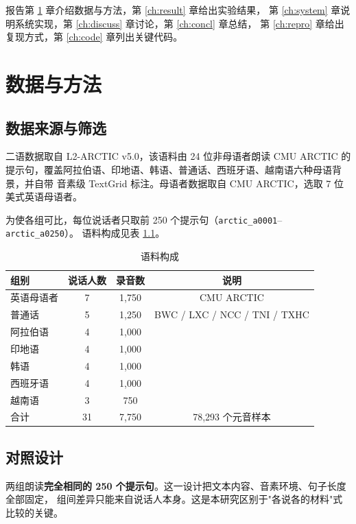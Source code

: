 \documentclass[12pt,a4paper,fontset=fandol]{ctexrep}
\begin{document}
报告第 \ref{ch:data} 章介绍数据与方法，第 \ref{ch:result} 章给出实验结果，
第 \ref{ch:system} 章说明系统实现，第 \ref{ch:discuss} 章讨论，第 \ref{ch:concl} 章总结，
第 \ref{ch:repro} 章给出复现方式，第 \ref{ch:code} 章列出关键代码。

\chapter{数据与方法}\label{ch:data}

\section{数据来源与筛选}

二语数据取自 L2-ARCTIC v5.0\cite{l2arctic}，该语料由 24 位非母语者朗读 CMU ARCTIC 的
提示句，覆盖阿拉伯语、印地语、韩语、普通话、西班牙语、越南语六种母语背景，并自带
音素级 TextGrid 标注。母语者数据取自 CMU ARCTIC\cite{cmuarctic}，选取 7 位美式英语母语者。

为使各组可比，每位说话者只取前 250 个提示句（\texttt{arctic\_a0001}–\texttt{arctic\_a0250}）。
语料构成见表 \ref{tab:data}。

\begin{table}[H]
\centering
\caption{语料构成}
\label{tab:data}
\begin{tabular}{lccc}
\toprule
组别 & 说话人数 & 录音数 & 说明 \\
\midrule
英语母语者 & 7 & 1{,}750 & CMU ARCTIC \\
普通话 & 5 & 1{,}250 & BWC / LXC / NCC / TNI / TXHC \\
阿拉伯语 & 4 & 1{,}000 & \\
印地语 & 4 & 1{,}000 & \\
韩语 & 4 & 1{,}000 & \\
西班牙语 & 4 & 1{,}000 & \\
越南语 & 3 & 750 & \\
\midrule
合计 & 31 & 7{,}750 & 78{,}293 个元音样本 \\
\bottomrule
\end{tabular}
\end{table}

\section{对照设计}

两组朗读\textbf{完全相同的 250 个提示句}。这一设计把文本内容、音素环境、句子长度全部固定，
组间差异只能来自说话人本身。这是本研究区别于"各说各的材料"式比较的关键。
\end{document}
